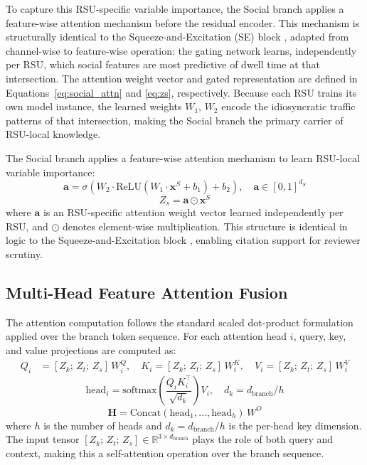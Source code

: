 \documentclass[journal]{IEEEtran}
\begin{document}
To capture this RSU-specific variable importance, the Social branch applies a feature-wise attention mechanism before the residual encoder.
This mechanism is structurally identical to the Squeeze-and-Excitation (SE) block \cite{Hu2018SENet}, adapted from channel-wise to feature-wise operation:
the gating network learns, independently per RSU, which social features are most predictive of dwell time at that intersection.
The attention weight vector and gated representation are defined in Equations~\eqref{eq:social_attn} and \eqref{eq:zs}, respectively.
Because each RSU trains its own model instance, the learned weights $W_1$, $W_2$ encode the idiosyncratic traffic patterns of that intersection, making the Social branch the primary carrier of RSU-local knowledge.

The Social branch applies a feature-wise attention mechanism \cite{Hu2018SENet} to learn RSU-local variable importance:
\begin{equation}
    \mathbf{a} = \sigma\!\left(W_2 \cdot \text{ReLU}(W_1 \cdot \mathbf{x}^S + b_1) + b_2\right), \quad \mathbf{a} \in [0,1]^{d_S}
    \label{eq:social_attn}
\end{equation}
\begin{equation}
    Z_s = \mathbf{a} \odot \mathbf{x}^S
    \label{eq:zs}
\end{equation}
where $\mathbf{a}$ is an RSU-specific attention weight vector learned independently per RSU, and $\odot$ denotes element-wise multiplication.
This structure is identical in logic to the Squeeze-and-Excitation block \cite{Hu2018SENet}, enabling citation support for reviewer scrutiny.

\subsection{Multi-Head Feature Attention Fusion}

The attention computation follows the standard scaled dot-product formulation applied over the branch token sequence.
For each attention head $i$, query, key, and value projections are computed as:
\begin{align}
    Q_i &= [Z_k;\, Z_t;\, Z_s]\, W^Q_i, \quad
    K_i = [Z_k;\, Z_t;\, Z_s]\, W^K_i, \quad
    V_i = [Z_k;\, Z_t;\, Z_s]\, W^V_i
    \label{eq:mha_proj}
\end{align}
\begin{equation}
    \text{head}_i = \text{softmax}\!\left(\frac{Q_i K_i^\top}{\sqrt{d_k}}\right) V_i, \quad d_k = d_\text{branch} / h
    \label{eq:mha_head}
\end{equation}
\begin{equation}
    \mathbf{H} = \text{Concat}(\text{head}_1, \ldots, \text{head}_h)\, W^O
    \label{eq:mha_concat}
\end{equation}
where $h$ is the number of heads and $d_k = d_\text{branch}/h$ is the per-head key dimension.
The input tensor $[Z_k;\, Z_t;\, Z_s] \in \mathbb{R}^{3 \times d_\text{branch}}$ plays the role of both query and context, making this a self-attention operation over the branch sequence.
\end{document}
